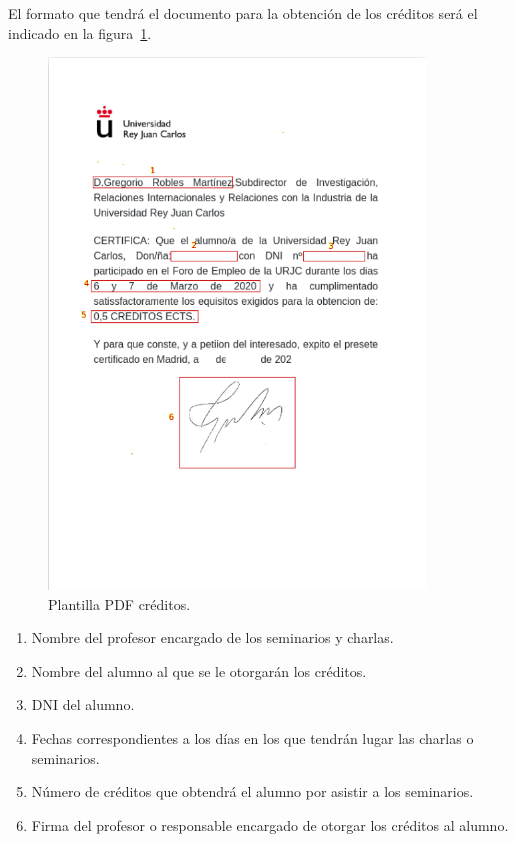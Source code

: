 \documentclass[a4paper, 12pt]{book}
\begin{document}
\clearpage

	El formato que tendrá el documento para la obtención de los créditos será el indicado en la figura~\ref{fig:pdfcreditos}.
	
\begin{figure}
  \centering
  \includegraphics[width=10cm, keepaspectratio]{img/certificadoCreditos.png}
  \caption{Plantilla PDF créditos.}\label{fig:pdfcreditos}
\end{figure}

\begin{enumerate}
		\item Nombre del profesor encargado de los seminarios y charlas.
		\item Nombre del alumno al que se le otorgarán los créditos.
		\item DNI del alumno.
		\item Fechas correspondientes a los días en los que tendrán lugar las charlas o seminarios.
		\item Número de créditos que obtendrá el alumno por asistir a los seminarios.
		\item Firma del profesor o responsable encargado de otorgar los créditos al alumno.
\end{enumerate}
\end{document}
